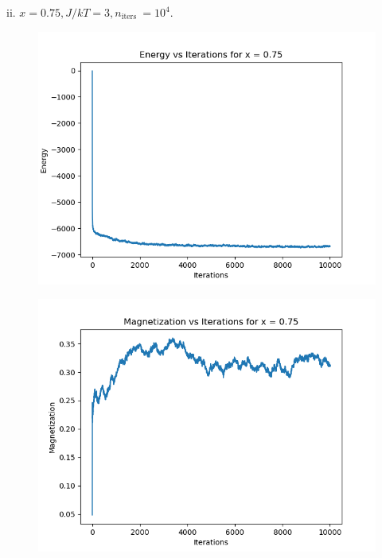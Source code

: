 \documentclass[12pt]{article}
\begin{document}
ii. $x=0.75, J / k T=3, n_{\text {iters }}=10^{4}$.\\
\begin{figure}
  \centering
  \includegraphics[max width=\textwidth]{energy_vs_iterations_0.75.png}
\end{figure}
\begin{figure}
  \centering
  \includegraphics[max width=\textwidth]{magnetization_vs_iterations_0.75.png}
\end{figure}
\end{document}

